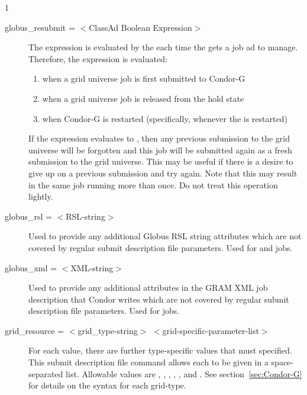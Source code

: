 \begin{ManPage}{\label{man-condor-submit}}{1}
\begin{description}

\item[globus\_resubmit = $<$ClassAd Boolean Expression$>$]
The expression is evaluated by the  each time
the  gets a job ad to manage.
Therefore, the expression is evaluated:
\begin{enumerate}
\item
   when a grid universe job is first submitted to Condor-G
\item
   when a grid universe job is released from the hold state
\item
   when Condor-G is restarted (specifically, whenever the 
   is restarted)
\end{enumerate}
If the expression evaluates to ,
then any previous submission to the grid universe will be
forgotten and this job will be submitted again as a fresh submission to
the grid universe.
This may be useful if there is a desire to give up on a
previous submission and try again.
Note that this may result in the same job running more than
once.  Do not treat this operation lightly.


\item[globus\_rsl = $<$RSL-string$>$] Used to provide any additional Globus RSL
string attributes which are not covered by regular submit description
file parameters. Used for 
 and  jobs.


\item[globus\_xml = $<$XML-string$>$]
Used to provide any additional attributes in the GRAM XML job description
that Condor writes which are not covered by regular submit description
file parameters. Used for   jobs.

\item[grid\_resource = $<$grid\_type-string$>$ $<$grid-specific-parameter-list$>$ ]
For each  value, 
there are further type-specific values that must specified.
This submit description file command allows each to
be given in a space-separated list.
Allowable  values are
, , ,
, , and .
See section~\ref{sec:Condor-G} for details on the syntax for each
grid-type.


\end{description}
\end{ManPage}
